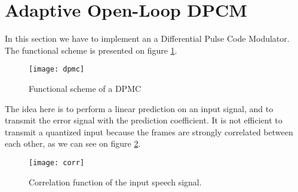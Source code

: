 \section{Adaptive Open-Loop DPCM}
In this section we have to implement an a Differential Pulse Code Modulator. The functional scheme is presented on figure \ref{dpmc}.
\begin{figure}[!ht]
\centering
\texttt{[image: dpmc]}
\caption{Functional scheme of a DPMC}
\label{dpmc}
\end{figure}

The idea here is to perform a linear prediction on an input signal, and to transmit the error signal with the prediction coefficient. It is not efficient to transmit a quantized input because the frames are strongly correlated between each other, as we can see on figure \ref{corr}.

\begin{figure}[!ht]
\centering
\texttt{[image: corr]}
\caption{Correlation function of the input speech signal.}
\label{corr}
\end{figure}

